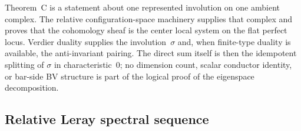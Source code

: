 Theorem~C is a statement about one represented involution on one
ambient complex. The relative configuration-space machinery supplies
that complex and proves that the cohomology sheaf is the center
local system on the flat perfect locus. Verdier duality supplies the
involution~$\sigma$ and, when finite-type duality is available, the
anti-invariant pairing. The direct sum itself is then the idempotent
splitting of $\sigma$ in characteristic~$0$; no dimension count,
scalar conductor identity, or bar-side BV structure is part of the
logical proof of the eigenspace decomposition.

\subsection{Relative Leray spectral sequence}

